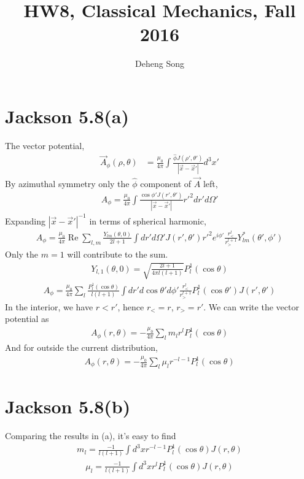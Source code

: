 \documentclass{article}
\begin{document}
\title{HW8, Classical Mechanics, Fall 2016}
\author{Deheng Song}
\maketitle

\section*{Jackson 5.8(a)}
The vector potential,
\begin{align*}
  \vec A_\phi(\rho,\theta)&=\frac{\mu_0}{4\pi}\int\frac{\hat\phi J(\rho',\theta')}{|\vec x-\vec x'|}d^3x'
\end{align*}
By azimuthal symmetry only the $\hat\phi$ component of $\vec A$ left,
\begin{align*}
  A_\phi=\frac{\mu_0}{4\pi}\int\frac{\cos\phi'J(r',\theta')}{|\vec x-\vec x'|}r'^2dr'd\Omega'
\end{align*}
Expanding $|\vec x-\vec x'|^{-1}$ in terms of spherical harmonic,
\begin{align*}
  A_\phi=\frac{\mu_0}{4\pi}\operatorname{Re}\sum_{l,m}\frac{Y_{lm}(\theta,0)}{2l+1}\int dr' d\Omega' J(r',\theta') r'^2 e^{i\phi'}\frac{r_<^l}{r_>^{l+1}}Y^*_{lm}(\theta',\phi')
\end{align*}
Only the $m=1$ will contribute to the sum.
\begin{align*}
  Y_{l,1}(\theta,0)=\sqrt{\frac{2l+1}{4\pi l(l+1)}}P_l^1(\cos\theta)
\end{align*}
\begin{align*}
  A_\phi=\frac{\mu_0}{4\pi}\sum_{l}\frac{P_l^1(\cos\theta)}{l(l+1)}\int dr'd\cos\theta'd\phi'\frac{r_<^l}{r_>^{l+1}}P_l^1(\cos\theta')J(r',\theta')
\end{align*}
In the interior, we have $r<r'$, hence $r_<=r$, $r_>=r'$. We can write the vector potential as
\begin{align*}
  A_\phi(r,\theta)=-\frac{\mu_0}{4\pi}\sum_{l}m_lr^lP_l^1(\cos\theta)
\end{align*}
And for outside the current distribution,
\begin{align*}
  A_\phi(r,\theta)=-\frac{\mu_0}{4\pi}\sum_{l}\mu_lr^{-l-1}P_l^1(\cos\theta)
\end{align*}

\section*{Jackson 5.8(b)}

Comparing the results in (a), it's easy to find
\begin{align*}
  m_l=\frac{-1}{l(l+1)}\int d^3x r^{-l-1}P_l^1(\cos\theta)J(r,\theta)
\end{align*}
\begin{align*}
  \mu_l=\frac{-1}{l(l+1)}\int d^3x r^lP_l^1(\cos\theta)J(r,\theta)
\end{align*}
\pagebreak
\end{document}
